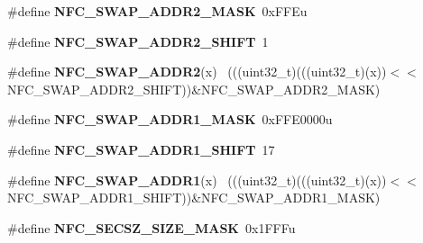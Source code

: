 \begin{DoxyCompactItemize}
\item 
\hypertarget{group___n_f_c___register___masks_ga0504db08b90ed634729e6c9c3b41dff0}{}\#define {\bfseries N\+F\+C\+\_\+\+S\+W\+A\+P\+\_\+\+A\+D\+D\+R2\+\_\+\+M\+A\+S\+K}~0x\+F\+F\+Eu\label{group___n_f_c___register___masks_ga0504db08b90ed634729e6c9c3b41dff0}

\item 
\hypertarget{group___n_f_c___register___masks_ga1d5c60100ca2a01e646760c20ed837c4}{}\#define {\bfseries N\+F\+C\+\_\+\+S\+W\+A\+P\+\_\+\+A\+D\+D\+R2\+\_\+\+S\+H\+I\+F\+T}~1\label{group___n_f_c___register___masks_ga1d5c60100ca2a01e646760c20ed837c4}

\item 
\hypertarget{group___n_f_c___register___masks_gab650e585e23453afc884a78a1be62cf1}{}\#define {\bfseries N\+F\+C\+\_\+\+S\+W\+A\+P\+\_\+\+A\+D\+D\+R2}(x)                                            ~(((uint32\+\_\+t)(((uint32\+\_\+t)(x))$<$$<$N\+F\+C\+\_\+\+S\+W\+A\+P\+\_\+\+A\+D\+D\+R2\+\_\+\+S\+H\+I\+F\+T))\&N\+F\+C\+\_\+\+S\+W\+A\+P\+\_\+\+A\+D\+D\+R2\+\_\+\+M\+A\+S\+K)\label{group___n_f_c___register___masks_gab650e585e23453afc884a78a1be62cf1}

\item 
\hypertarget{group___n_f_c___register___masks_gafdc3199a5084f0d155c71472664e2aa9}{}\#define {\bfseries N\+F\+C\+\_\+\+S\+W\+A\+P\+\_\+\+A\+D\+D\+R1\+\_\+\+M\+A\+S\+K}~0x\+F\+F\+E0000u\label{group___n_f_c___register___masks_gafdc3199a5084f0d155c71472664e2aa9}

\item 
\hypertarget{group___n_f_c___register___masks_ga483939b350cb06b28c3f69e1deeb8d84}{}\#define {\bfseries N\+F\+C\+\_\+\+S\+W\+A\+P\+\_\+\+A\+D\+D\+R1\+\_\+\+S\+H\+I\+F\+T}~17\label{group___n_f_c___register___masks_ga483939b350cb06b28c3f69e1deeb8d84}

\item 
\hypertarget{group___n_f_c___register___masks_gae81060cf7e615f79814ff699e8630c68}{}\#define {\bfseries N\+F\+C\+\_\+\+S\+W\+A\+P\+\_\+\+A\+D\+D\+R1}(x)                                            ~(((uint32\+\_\+t)(((uint32\+\_\+t)(x))$<$$<$N\+F\+C\+\_\+\+S\+W\+A\+P\+\_\+\+A\+D\+D\+R1\+\_\+\+S\+H\+I\+F\+T))\&N\+F\+C\+\_\+\+S\+W\+A\+P\+\_\+\+A\+D\+D\+R1\+\_\+\+M\+A\+S\+K)\label{group___n_f_c___register___masks_gae81060cf7e615f79814ff699e8630c68}

\item 
\hypertarget{group___n_f_c___register___masks_gaac48bdabb641b2e528391801439d0ab1}{}\#define {\bfseries N\+F\+C\+\_\+\+S\+E\+C\+S\+Z\+\_\+\+S\+I\+Z\+E\+\_\+\+M\+A\+S\+K}~0x1\+F\+F\+Fu\label{group___n_f_c___register___masks_gaac48bdabb641b2e528391801439d0ab1}


\end{DoxyCompactItemize}
